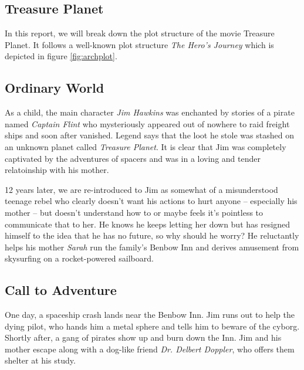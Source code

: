 \documentclass[notitlepage]{fhnwreport}
\begin{document}
\begin{multicols}{2}

\section*{Treasure Planet}

In  this  report, we will break down the plot structure of the movie  Treasure
Planet\cite{ref:treasure-planet}.  It  follows  a  well-known  plot  structure
\textit{The  Hero's  Journey}\cite{ref:heros-journey}  which  is  depicted  in
figure \ref{fig:archplot}.

\subsection*{Ordinary World}

As  a child, the main character \textit{Jim Hawkins} was enchanted by  stories
of  a  pirate  named  \textit{Captain  Flint} who mysteriously appeared out of
nowhere to raid freight ships and soon  after  vanished.  Legend says that the
loot he stole  was  stashed  on  an  unknown  planet  called  \textit{Treasure
Planet}. It  is  clear that Jim was completely captivated by the adventures of
spacers  and  was  in  a  loving  and tender  relatoinship  with  his  mother.

12 years later, we are re-introduced to Jim  as  somewhat  of  a misunderstood
teenage rebel  who  clearly  doesn't  want  his  actions  to  hurt  anyone  --
especially  his  mother  --  but doesn't understand how to or maybe feels it's
pointless to communicate that  to  her. He knows he keeps letting her down but
has  resigned  himself  to  the idea that he has no future, so why  should  he
worry? He reluctantly helps his mother \textit{Sarah} run the  family's Benbow
Inn and derives  amusement  from  skysurfing  on  a  rocket-powered sailboard.

\subsection*{Call to Adventure}

One day, a spaceship crash lands near the Benbow Inn. Jim runs out to help the
dying  pilot,  who  hands  him a metal sphere and tells him to beware  of  the
cyborg. Shortly after,  a  gang  of pirates show up and burn down the Inn. Jim
and  his  mother  escape  along  with  a dog-like friend  \textit{Dr.  Delbert
Doppler}, who offers them shelter at his study.


\end{multicols}
\end{document}

